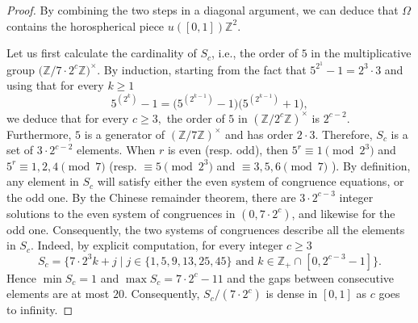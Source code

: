 \documentclass[11pt,letterpaper]{amsart}
\theoremstyle{definition}
\theoremstyle{remark}
\newcommand{\bb}[1]{\mathbb{#1}}
\newcommand{\Z}{\bb Z}
\begin{document}
\begin{proof}
By combining the two steps in a diagonal argument, we can deduce that $\Omega$ contains the horospherical piece $u([0,1])\Z^2$.


Let us first calculate the cardinality of $S_c$, i.e., the order of $5$ in the multiplicative group $\big(\Z / 7 \cdot 2^c\Z\big)^\times$.
By induction, starting from the fact that $5^{2^1}-1 = 2^3 \cdot 3$ and using that for every $k\geq 1$ 
$$5^{(2^k)} - 1 = \Big( 5^{(2^{k-1})}-1 \Big) \Big(5^{(2^{k-1})}+1 \Big),$$ 
we deduce that for every $c\geq 3,$ the order of $5$ in $(\Z/2^c\Z)^\times$ is $2^{c-2}$.
Furthermore, $5$ is a generator of $(\Z/7\Z)^\times$ and has order $2 \cdot 3$.
Therefore, $S_c$ is a set of $3 \cdot 2^{c-2}$ elements.
When $r$ is even (resp. odd), then $5^r\equiv 1 \pmod{2^3}$ and $5^r \equiv 1,2,4 \pmod 7 $ (resp. $\equiv 5 \pmod{2^3}$ and $\equiv  3,5,6  \pmod 7 $ ). 
By definition, any element in $S_c$ will satisfy either the even system of congruence equations, or the odd one. 
By the Chinese remainder theorem, there are $3 \cdot 2^{c-3}$ integer solutions to the even system of congruences in $(0, 7 \cdot 2^c)$, and likewise for the odd one. 
Consequently, the two systems of congruences describe all the elements in $S_c$.
Indeed, by explicit computation, for every integer $c\geq 3$
$$S_c = \big\lbrace  7 \cdot 2^3 k + j \; \big\vert \; j\in \lbrace 1,5,9,13,25,45 \rbrace \text{ and } k\in \Z_+ \cap [0,2^{c-3}-1]  \big\rbrace.$$
Hence $\min S_c = 1$ and $\max S_c = 7 \cdot 2^c - 11$ and the gaps between consecutive elements are at most $20$.
Consequently, $S_c/(7 \cdot 2^c)$ is dense in $[0,1]$ as $c$ goes to infinity.


\end{proof}
\end{document}
